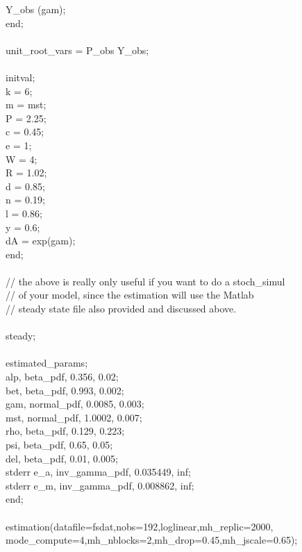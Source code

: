 {Y\_obs (gam);\\
end;\\
\\
unit\_root\_vars = P\_obs Y\_obs;\\
\\
initval;\\
k = 6;\\
m = mst;\\
P = 2.25;\\
c = 0.45;\\
e = 1;\\
W = 4;\\
R = 1.02;\\
d = 0.85;\\
n = 0.19;\\
l = 0.86;\\
y = 0.6;\\
dA = exp(gam);\\
end;\\
\\
// the above is really only useful if you want to do a stoch\_simul\\
// of your model, since the estimation will use the Matlab\\
// steady state file also provided and discussed above.\\
\\
steady;\\
\\
estimated\_params;\\
alp, beta\_pdf, 0.356, 0.02; \\ 
bet, beta\_pdf, 0.993, 0.002; \\
gam, normal\_pdf, 0.0085, 0.003; \\
mst, normal\_pdf, 1.0002, 0.007; \\
rho, beta\_pdf, 0.129, 0.223;\\
psi, beta\_pdf, 0.65, 0.05;\\
del, beta\_pdf, 0.01, 0.005;\\
stderr e\_a, inv\_gamma\_pdf, 0.035449, inf;\\
stderr e\_m, inv\_gamma\_pdf, 0.008862, inf;\\
end;\\
\\
estimation(datafile=fsdat,nobs=192,loglinear,mh\_replic=2000,\\
mode\_compute=4,mh\_nblocks=2,mh\_drop=0.45,mh\_jscale=0.65);}\\
\\

